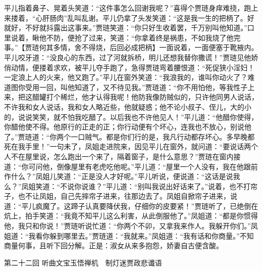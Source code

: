 \documentclass[12pt,oneside]{book}
\begin{document}
平儿指着鼻子、晃着头笑道：“这件事怎么回谢我呢？”喜得个贾琏身痒难挠，跑上来搂着，“心肝肠肉”乱叫乱谢。平儿仍拿了头发笑道：“这是我一生的把柄了。好就好，不好就抖露出这事来。”贾琏笑道：“你只好生收着罢，千万别叫他知道。”口里说着，瞅他不防，便抢了过来，笑道：“你拿着终是祸患，不如我烧了他完事。”【贾琏何其多情，舍不得烧，后回必成把柄】一面说着，一面便塞于靴掖内。平儿咬牙道：“没良心的东西，过了河就拆桥，明儿还想我替你撒谎！”贾琏见他娇俏动情，便搂着求欢，被平儿夺手跑了，急得贾琏弯着腰恨道：“死促狭小淫妇！一定浪上人的火来，他又跑了。”平儿在窗外笑道：“我浪我的，谁叫你动火了？难道图你受用一回，叫他知道了，又不待见我。”贾琏道：“你不用怕他，等我性子上来，把这醋罐打个稀烂，他才认得我呢！他防我像防贼似的，只许他同男人说话，不许我和女人说话，我和女人略近些，他就疑惑；他不论小叔子、侄儿，大的小的，说说笑笑，就不怕我吃醋了。以后我也不许他见人！”平儿道：“他醋你使得，你醋他使不得。他原行的正走的正；你行动便有个坏心，连我也不放心，别说他了。”贾琏道：“你两个一口贼气。都是你们行的是，我凡行动都存坏心。多早晚都死在我手里！”一句未了，凤姐走进院来，因见平儿在窗外，就问道：“要说话两个人不在屋里说，怎么跑出一个来了，隔着窗子，是什么意思？”贾琏在窗内接道：“你可问他，倒像屋里有老虎吃他呢。”平儿道：“屋里一个人没有，我在他跟前作什么？”凤姐儿笑道：“正是没人才好呢。”平儿听说，便说道：“这话是说我么？”凤姐笑道：“不说你说谁？”平儿道：“别叫我说出好话来了。”说着，也不打帘子，也不让凤姐，自己先摔帘子进来，往那边去了。凤姐自掀帘子进来，说道：“平儿疯魔了。这蹄子认真要降伏我，仔细你的皮要紧！”贾琏听了，已绝倒在炕上，拍手笑道：“我竟不知平儿这么利害，从此倒服他了。”凤姐道：“都是你惯得他，我只和你说！”贾琏听说忙道：“你两个不卯，又拿我来作人。我躲开你们。”凤姐道：“我看你躲到哪里去。”贾琏道：“我就来。”凤姐道：“我有话和你商量。”不知商量何事，且听下回分解。正是：淑女从来多抱怨，娇妻自古便含酸。

 

 
第二十二回  听曲文宝玉悟禅机　制灯迷贾政悲谶语
\end{document}
